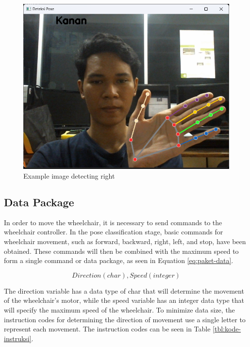 \begin{figure} [!h] \centering
  \includegraphics[scale=0.48]{gambar/bab3/Kanan}
  \caption{Example image detecting right}
  \label{fig:klasifikasi kanan}
\end{figure}

\newpage

\subsection{Data Package}
In order to move the wheelchair, it is necessary to send commands to the wheelchair controller. In the pose classification stage, basic commands for wheelchair movement, such as forward, backward, right, left, and stop, have been obtained. These commands will then be combined with the maximum speed to form a single command or data package, as seen in Equation \ref{eq:paket-data}.

\begin{equation}
  \label{eq:paket-data}
    Direction(char),Speed(integer)
\end{equation}

The direction variable has a data type of char that will determine the movement of the wheelchair's motor, while the speed variable has an integer data type that will specify the maximum speed of the wheelchair. To minimize data size, the instruction codes for determining the direction of movement use a single letter to represent each movement. The instruction codes can be seen in Table \ref{tbl:kode-instruksi}. 

